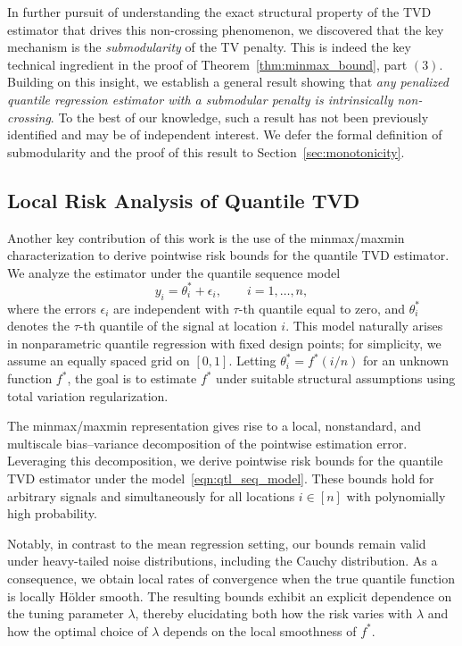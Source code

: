\documentclass[11pt]{article}
\theoremstyle{plain}
\theoremstyle{definition}
\theoremstyle{remark}
\begin{document}
In further pursuit of understanding the exact structural property of the TVD estimator that drives this non-crossing phenomenon, we discovered that the key mechanism is the \emph{submodularity} of the TV penalty. This is indeed the key technical ingredient in the proof of Theorem~\ref{thm:minmax_bound}, part $(3)$. Building on this insight, we establish a general result showing that \textit{any penalized quantile regression estimator with a submodular penalty is intrinsically non-crossing}. To the best of our knowledge, such a result has not been previously identified and may be of independent interest. We defer the formal definition of submodularity and the proof of this result to Section~\ref{sec:monotonicity}.


\subsection{Local Risk Analysis of Quantile TVD}\label{sec:intro_localrisk}

Another key contribution of this work is the use of the minmax/maxmin characterization to derive pointwise risk bounds for the quantile TVD estimator. We analyze the estimator under the quantile sequence model
\begin{equation}\label{eqn:qtl_seq_model}
    y_i = \theta_i^* + \epsilon_i, \qquad i=1,\dots,n,
\end{equation}
where the errors $\epsilon_i$ are independent with $\tau$-th quantile equal to zero, and $\theta_i^*$ denotes the $\tau$-th quantile of the signal at location $i$. This model naturally arises in nonparametric quantile regression with fixed design points; for simplicity, we assume an equally spaced grid on $[0,1]$. Letting $\theta_i^* = f^*(i/n)$ for an unknown function $f^*$, the goal is to estimate $f^*$ under suitable structural assumptions using total variation regularization.

The minmax/maxmin representation gives rise to a local, nonstandard, and multiscale bias--variance decomposition of the pointwise estimation error. Leveraging this decomposition, we derive pointwise risk bounds for the quantile TVD estimator under the model~\eqref{eqn:qtl_seq_model}. These bounds hold for arbitrary signals and simultaneously for all locations $i \in [n]$ with polynomially high probability.

Notably, in contrast to the mean regression setting, our bounds remain valid under heavy-tailed noise distributions, including the Cauchy distribution. As a consequence, we obtain local rates of convergence when the true quantile function is locally H\"older smooth. The resulting bounds exhibit an explicit dependence on the tuning parameter $\lambda$, thereby elucidating both how the risk varies with $\lambda$ and how the optimal choice of $\lambda$ depends on the local smoothness of $f^*$.
\end{document}
